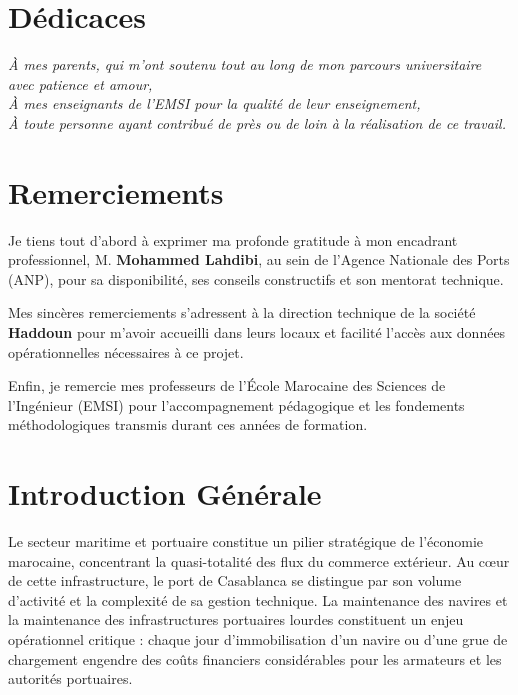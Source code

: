 \documentclass[12pt,a4paper,oneside]{report}
\begin{document}
\chapter*{Dédicaces}
\begin{center}
    \emph{À mes parents, qui m'ont soutenu tout au long de mon parcours universitaire avec patience et amour,}\\
    \emph{À mes enseignants de l'EMSI pour la qualité de leur enseignement,}\\
    \emph{À toute personne ayant contribué de près ou de loin à la réalisation de ce travail.}
\end{center}

\chapter*{Remerciements}
Je tiens tout d'abord à exprimer ma profonde gratitude à mon encadrant professionnel, M. \textbf{Mohammed Lahdibi}, au sein de l'Agence Nationale des Ports (ANP), pour sa disponibilité, ses conseils constructifs et son mentorat technique.

Mes sincères remerciements s'adressent à la direction technique de la société \textbf{Haddoun} pour m'avoir accueilli dans leurs locaux et facilité l'accès aux données opérationnelles nécessaires à ce projet.

Enfin, je remercie mes professeurs de l'École Marocaine des Sciences de l'Ingénieur (EMSI) pour l'accompagnement pédagogique et les fondements méthodologiques transmis durant ces années de formation.

\tableofcontents
\listoffigures
\listoftables

\chapter*{Introduction Générale}

Le secteur maritime et portuaire constitue un pilier stratégique de l'économie marocaine, concentrant la quasi-totalité des flux du commerce extérieur. Au cœur de cette infrastructure, le port de Casablanca se distingue par son volume d'activité et la complexité de sa gestion technique. La maintenance des navires et la maintenance des infrastructures portuaires lourdes constituent un enjeu opérationnel critique : chaque jour d'immobilisation d'un navire ou d'une grue de chargement engendre des coûts financiers considérables pour les armateurs et les autorités portuaires.
\end{document}
